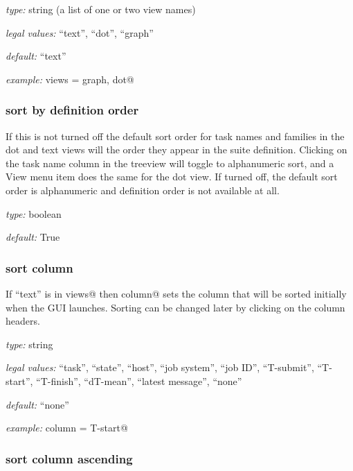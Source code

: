 \begin{myitemize}
\item {\em type:} string (a list of one or two view names)
\item {\em legal values:} ``text'', ``dot'',  ``graph''
\item {\em default:} ``text''
\item {\em example:} \lstinline@initial views = graph, dot@
\end{myitemize}

\subsubsection{sort by definition order}

If this is not turned off the default sort order for task names and
families in the dot and text views will the order they appear in the
suite definition. Clicking on the task name column in the treeview will
toggle to alphanumeric sort, and a View menu item does the same for the
dot view.  If turned off, the default sort order is alphanumeric and
definition order is not available at all.

\begin{myitemize}
\item {\em type:} boolean
\item {\em default:} True
\end{myitemize}


\subsubsection{sort column}

If ``text'' is in \lstinline@initial views@ then \lstinline@sort column@ sets
the column that will be sorted initially when the GUI launches. Sorting can be
changed later by clicking on the column headers.

\begin{myitemize}
    \item {\em type:} string
    \item {\em legal values:} ``task'', ``state'', ``host'', ``job system'',
        ``job ID'', ``T-submit'', ``T-start'', ``T-finish'', ``dT-mean'',
        ``latest message'', ``none''
    \item {\em default:} ``none''
    \item {\em example:} \lstinline@sort column = T-start@
\end{myitemize}


\subsubsection{sort column ascending}

